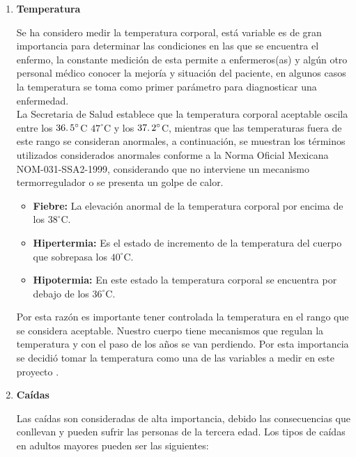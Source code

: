 \begin{enumerate}
	\item \textbf{Temperatura} 
	
	Se ha considero medir la temperatura corporal, está variable es de gran importancia para determinar las condiciones en las que se encuentra el enfermo, la constante medición de esta permite a enfermeros(as) y algún otro personal médico conocer la mejoría y situación del paciente, en algunos casos la temperatura se toma como primer parámetro para diagnosticar una enfermedad. \\
	
	La Secretaria de Salud establece que la temperatura corporal aceptable oscila entre los $36\ldotp5^{\circ}$C $47^{\circ}$C y los $37\ldotp2^{\circ}$C, mientras que las temperaturas fuera de este rango se consideran anormales, a continuación, se muestran los términos utilizados considerados anormales conforme a la Norma Oficial Mexicana NOM-031-SSA2-1999, considerando que no interviene un mecanismo termorregulador o se presenta un golpe de calor.
	
	\begin{itemize}
		\item \textbf{Fiebre:} La elevación anormal de la temperatura corporal por encima de los $38^{\circ}$C.
		\item \textbf{Hipertermia:} Es el estado de incremento de la temperatura del cuerpo que sobrepasa los $40^{\circ}$C.
		\item \textbf{Hipotermia:} En este estado la temperatura corporal se encuentra por debajo de los $36^{\circ}$C.
	\end{itemize}
	
	Por esta razón es importante tener controlada la temperatura en el rango que se considera aceptable. Nuestro cuerpo tiene mecanismos que regulan la temperatura y con el paso de los años se van perdiendo. Por esta importancia se decidió tomar la temperatura como una de las variables a medir en este proyecto \cite{once}.
	
	\item \textbf{Caídas}
	
	Las caídas son consideradas de alta importancia, debido las consecuencias que conllevan y pueden sufrir las personas de la tercera edad. Los tipos de caídas en adultos mayores pueden ser las siguientes:
	

\end{enumerate}

